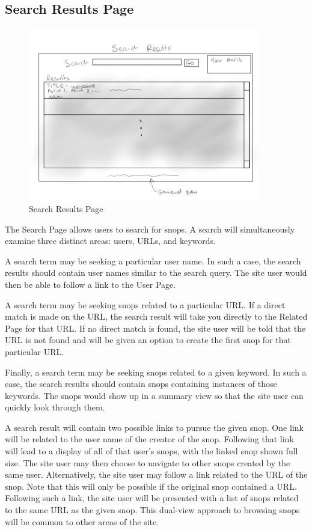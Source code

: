 \documentclass[11pt]{article}
\begin{document}
\subsection{Search Results Page}
\label{sec:search_results_page}
\begin{figure}[htb]
\begin{center}
\includegraphics[width=0.9\textwidth]{search_results.png}
\caption{Search Results Page}
\label{fig:fig_search_results_page}
\end{center}
\end{figure}
The Search Page allows users to search for snops. A search will simultaneously examine three distinct areas: users, URLs, and keywords.

A search term may be seeking a particular user name. In such a case, the search results should contain user names similar to the search query. The site user would then be able to follow a link to the User Page.

A search term may be seeking snops related to a particular URL. If a direct match is made on the URL, the search result will take you directly to the Related Page for that URL. If no direct match is found, the site user will be told that the URL is not found and will be given an option to create the first snop for that particular URL.

Finally, a search term may be seeking snops related to a given keyword. In such a case, the search results should contain snops containing instances of those keywords. The snops would show up in a summary view so that the site user can quickly look through them.

A search result will contain two possible links to pursue the given snop. One link will be related to the user name of the creator of the snop. Following that link will lead to a display of all of that user's snops, with the linked snop shown full size. The site user may then choose to navigate to other snops created by the same user. Alternatively, the site user may follow a link related to the URL of the snop. Note that this will only be possible if the original snop contained a URL. Following such a link, the site user will be presented with a list of snops related to the same URL as the given snop. This dual-view approach to browsing snops will be common to other areas of the site.
\end{document}
